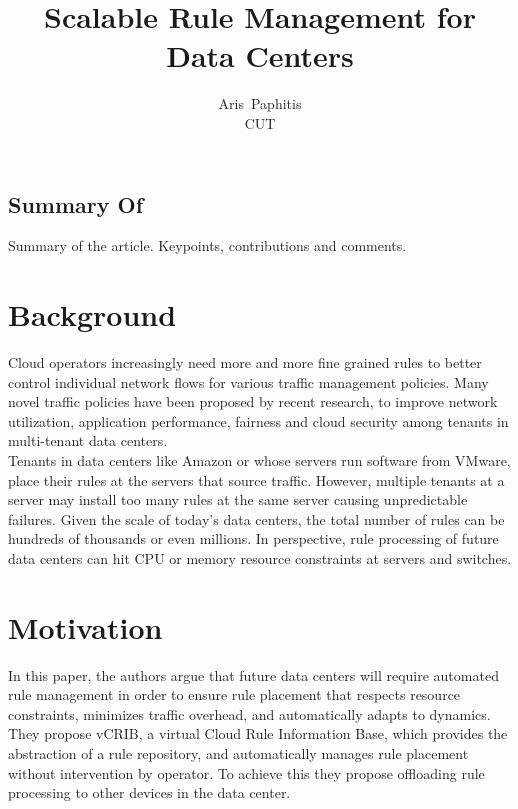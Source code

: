 \documentclass[letterpaper,twocolumn,10pt]{article}
\begin{document}
\date{}

\title{\Large \bf Scalable Rule Management for Data Centers}

\author{
{\rm Aris\ Paphitis}\\
CUT
} %

\maketitle

\thispagestyle{empty}


\subsection*{Summary Of}
Summary of the article. Keypoints, contributions and comments.

\section{Background}

Cloud operators increasingly need more and more fine grained rules to better control individual network flows for various traffic management policies. Many novel traffic policies have been proposed by recent research, to improve network utilization, application performance, fairness and cloud security among tenants in multi-tenant data centers.\\
Tenants in data centers like Amazon or whose servers run software from VMware, place their rules at the servers that source traffic. However, multiple tenants at a server may install too many rules at the same server causing unpredictable failures. Given the scale of today's data centers, the total number of rules can be hundreds of thousands or even millions. In perspective, rule processing of future data centers can hit CPU or memory resource constraints at servers and switches.

\section{Motivation}
In this paper, the authors argue that future data centers will require automated rule management in order to ensure rule placement that respects resource constraints, minimizes traffic overhead, and automatically adapts to dynamics. They propose vCRIB, a virtual Cloud Rule Information Base, which provides the abstraction of a rule repository, and automatically manages rule placement without intervention by operator. To achieve this they propose offloading rule processing to other devices in the data center.\\
\end{document}
